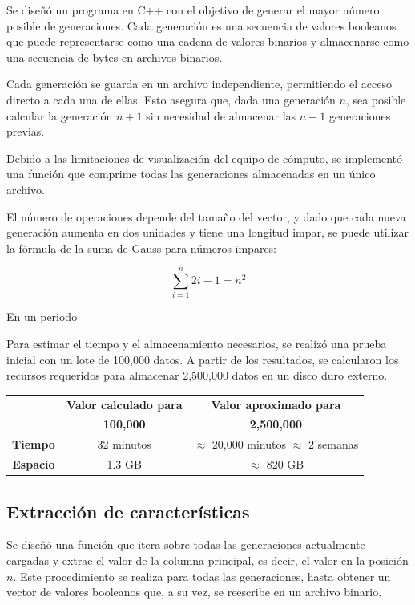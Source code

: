 \documentclass[12pt,twoside]{article}
\begin{document}
	Se diseñó un programa en C++ con el objetivo de generar el mayor número posible de generaciones. Cada generación es una secuencia de valores booleanos que puede representarse como una cadena de valores binarios y almacenarse como una secuencia de bytes en archivos binarios.
	
	Cada generación se guarda en un archivo independiente, permitiendo el acceso directo a cada una de ellas. Esto asegura que, dada una generación $n$, sea posible calcular la generación $n+1$ sin necesidad de almacenar las $n-1$ generaciones previas.
	
	Debido a las limitaciones de visualización del equipo de cómputo, se implementó una función que comprime todas las generaciones almacenadas en un único archivo.
	
	El número de operaciones depende del tamaño del vector, y dado que cada nueva generación aumenta en dos unidades y tiene una longitud impar, se puede utilizar la fórmula de la suma de Gauss para números impares:
	
	\begin{equation*}
		\sum_{i = 1}^{n} 2i - 1 = n^2
	\end{equation*}
	
	En un periodo 
	
	Para estimar el tiempo y el almacenamiento necesarios, se realizó una prueba inicial con un lote de 100,000 datos. A partir de los resultados, se calcularon los recursos requeridos para almacenar 2,500,000 datos en un disco duro externo.
	
	\begin{center}
		\begin{tabular}{|c|c|c|}
			\hline
			& \textbf{Valor calculado para} & \textbf{Valor aproximado para} \\
			& \textbf{100,000} & \textbf{2,500,000} \\
			\hline
			\textbf{Tiempo} & 32 minutos & $\approx$ 20,000 minutos $\approx$ 2 semanas \\
			\hline
			\textbf{Espacio} & 1.3 GB & $\approx$ 820 GB \\
			\hline
		\end{tabular}
	\end{center}
	
	\subsection{Extracción de características}
	
	Se diseñó una función que itera sobre todas las generaciones actualmente cargadas y extrae el valor de la columna principal, es decir, el valor en la posición $n$. Este procedimiento se realiza para todas las generaciones, hasta obtener un vector de valores booleanos que, a su vez, se reescribe en un archivo binario.
	
\end{document}
